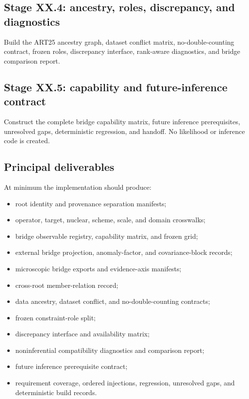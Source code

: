 \documentclass[11pt]{article}
\begin{document}
\subsection{Stage XX.4: ancestry, roles, discrepancy, and diagnostics}

Build the ART25 ancestry graph, dataset conflict matrix, no-double-counting contract, frozen roles, discrepancy interface, rank-aware diagnostics, and bridge comparison report.

\subsection{Stage XX.5: capability and future-inference contract}

Construct the complete bridge capability matrix, future inference prerequisites, unresolved gaps, deterministic regression, and handoff.  No likelihood or inference code is created.

\subsection{Principal deliverables}

At minimum the implementation should produce:
\begin{itemize}
\item root identity and provenance separation manifests;
\item operator, target, nuclear, scheme, scale, and domain crosswalks;
\item bridge observable registry, capability matrix, and frozen grid;
\item external bridge projection, anomaly-factor, and covariance-block records;
\item microscopic bridge exports and evidence-axis manifests;
\item cross-root member-relation record;
\item data ancestry, dataset conflict, and no-double-counting contracts;
\item frozen constraint-role split;
\item discrepancy interface and availability matrix;
\item noninferential compatibility diagnostics and comparison report;
\item future inference prerequisite contract;
\item requirement coverage, ordered injections, regression, unresolved gaps, and deterministic build records.
\end{itemize}
\end{document}
